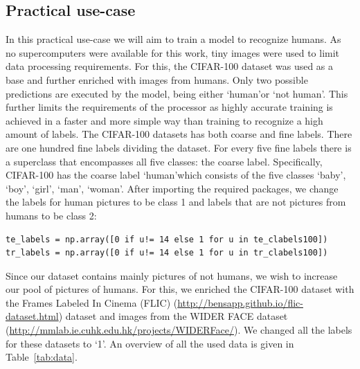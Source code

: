 \subsection{Practical use-case \label{subsec:case}}
In this practical use-case we will aim to train a model to recognize humans. As no supercomputers were available for this work, tiny images were used to limit data processing requirements. For this, the CIFAR-100 dataset was used as a base and further enriched with images from humans. Only two possible predictions are executed by the model, being either \textquoteleft human\textquoteright  or \textquoteleft not human\textquoteright . This further limits the requirements of the processor as highly accurate training is achieved in a faster and more simple way than training to recognize a high amount of labels. 
The CIFAR-100 datasets has both coarse and fine labels. There are one hundred fine labels dividing the dataset. For every five fine labels there is a superclass that encompasses all five classes: the coarse label. Specifically, CIFAR-100 has  the coarse label \textquoteleft human\textquoteright  which consists of the five classes \textquoteleft baby\textquoteright , \textquoteleft boy\textquoteright , \textquoteleft girl\textquoteright , \textquoteleft man\textquoteright , \textquoteleft woman\textquoteright . 
After importing the required packages, we change the labels for human pictures to be class 1 and labels that are not pictures from humans to be class 2:

\begin{lstlisting}[caption= welke caption?, label=humanlabels]
te_labels = np.array([0 if u!= 14 else 1 for u in te_clabels100])
tr_labels = np.array([0 if u!= 14 else 1 for u in tr_clabels100])

\end{lstlisting}

Since our dataset contains mainly pictures of not humans, we wish to increase our pool of pictures of humans. For this, we enriched the CIFAR-100 dataset with the Frames Labeled In Cinema (FLIC) (\url{http://bensapp.github.io/flic-dataset.html})  dataset and images from the WIDER FACE dataset (\url{http://mmlab.ie.cuhk.edu.hk/projects/WIDERFace/}). We changed all the labels for these datasets to \textquoteleft 1\textquoteright . An overview of all the used data is given in Table~\ref{tab:data}.


